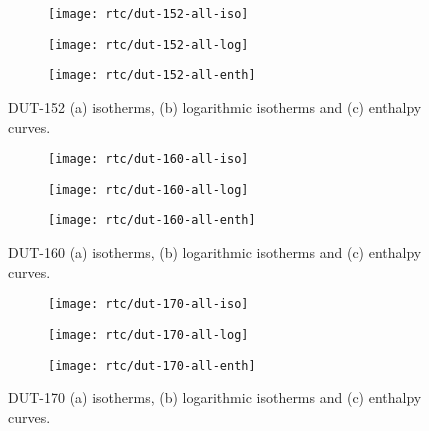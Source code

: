 \begin{figure}[H]
    \centering
    \begin{subfigure}{0.33\linewidth}
        \texttt{[image: rtc/dut-152-all-iso]}%
        \caption{}
    \end{subfigure}%
    \begin{subfigure}{0.33\linewidth}
        \texttt{[image: rtc/dut-152-all-log]}%
        \caption{}
    \end{subfigure}%
    \begin{subfigure}{0.33\linewidth}
        \texttt{[image: rtc/dut-152-all-enth]}%
        \caption{}
    \end{subfigure}%
    \caption{DUT-152 (a) isotherms, (b) logarithmic isotherms and 
    (c) enthalpy curves.}%
    \label{appx:dut:fig:dut-152-butane-rtc}
\end{figure}

\begin{figure}[H]
    \centering
    \begin{subfigure}{0.33\linewidth}
        \texttt{[image: rtc/dut-160-all-iso]}%
        \caption{}
    \end{subfigure}%
    \begin{subfigure}{0.33\linewidth}
        \texttt{[image: rtc/dut-160-all-log]}%
        \caption{}
    \end{subfigure}%
    \begin{subfigure}{0.33\linewidth}
        \texttt{[image: rtc/dut-160-all-enth]}%
        \caption{}
    \end{subfigure}%
    \caption{DUT-160 (a) isotherms, (b) logarithmic isotherms and 
    (c) enthalpy curves.}%
    \label{appx:dut:fig:dut-160-butane-rtc}
\end{figure}

\begin{figure}[H]
    \centering
    \begin{subfigure}{0.33\linewidth}
        \texttt{[image: rtc/dut-170-all-iso]}%
        \caption{}
    \end{subfigure}%
    \begin{subfigure}{0.33\linewidth}
        \texttt{[image: rtc/dut-170-all-log]}%
        \caption{}
    \end{subfigure}%
    \begin{subfigure}{0.33\linewidth}
        \texttt{[image: rtc/dut-170-all-enth]}%
        \caption{}
    \end{subfigure}%
    \caption{DUT-170 (a) isotherms, (b) logarithmic isotherms and 
    (c) enthalpy curves.}%
    \label{appx:dut:fig:dut-170-butane-rtc}
\end{figure}

